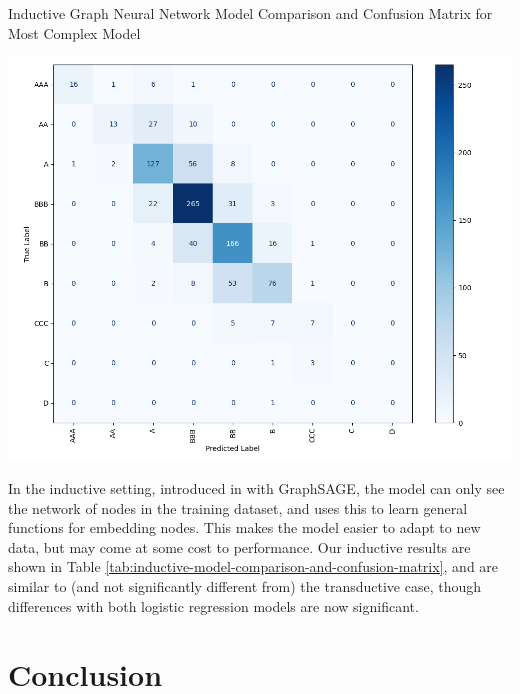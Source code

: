\documentclass{article}[11pt]
\begin{document}
    \begin{table}[h!]
        \centering
        \caption{Inductive Graph Neural Network Model Comparison and Confusion Matrix for Most Complex Model}
        \begin{minipage}[c]{0.495\linewidth}
            \centering
            
        \end{minipage}
        \begin{minipage}[c]{0.495\linewidth}
            \centering
            \includegraphics[width=0.95\hsize]{../Output/Modelling/Graph Neural Network/Inductive/confusion_matrix_no_title.png}
        \end{minipage}
        \label{tab:inductive-model-comparison-and-confusion-matrix}
    \end{table}


    In the inductive setting, introduced in \cite{hamilton_inductive_2018} with GraphSAGE, the model can only see the network of nodes in the training dataset, and uses this to learn general functions for embedding nodes. This makes the model easier to adapt to new data, but may come at some cost to performance. Our inductive results are shown in Table \ref{tab:inductive-model-comparison-and-confusion-matrix}, and are similar to (and not significantly different from) the transductive case, though differences with both logistic regression models are now significant.

    \section*{Conclusion}
\end{document}
